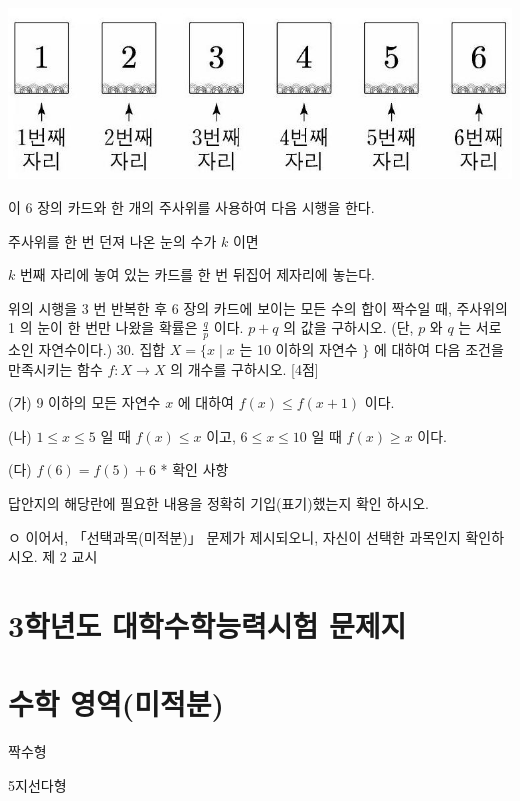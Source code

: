 \documentclass[10pt]{article}
\begin{document}
\begin{center}
\includegraphics[max width=\textwidth]{2023_05_19_a9cef858603f6abf5411g-32}
\end{center}

이 6 장의 카드와 한 개의 주사위를 사용하여 다음 시행을 한다.

주사위를 한 번 던져 나온 눈의 수가 $k$ 이면

$k$ 번째 자리에 놓여 있는 카드를 한 번 뒤집어 제자리에 놓는다.

위의 시행을 3 번 반복한 후 6 장의 카드에 보이는 모든 수의 합이 짝수일 때, 주사위의 1 의 눈이 한 번만 나왔을 확률은 $\frac{q}{p}$ 이다. $p+q$ 의 값을 구하시오. (단, $p$ 와 $q$ 는 서로소인 자연수이다.) 30. 집합 $X=\{x \mid x$ 는 10 이하의 자연수 $\}$ 에 대하여 다음 조건을 만족시키는 함수 $f: X \rightarrow X$ 의 개수를 구하시오. [4점]

(가) 9 이하의 모든 자연수 $x$ 에 대하여 $f(x) \leq f(x+1)$ 이다.

(나) $1 \leq x \leq 5$ 일 때 $f(x) \leq x$ 이고, $6 \leq x \leq 10$ 일 때 $f(x) \geq x$ 이다.

(다) $f(6)=f(5)+6$ * 확인 사항

답안지의 해당란에 필요한 내용을 정확히 기입(표기)했는지 확인 하시오.

ㅇ 이어서, 「선택과목(미적분)」 문제가 제시되오니, 자신이 선택한 과목인지 확인하시오. 제 2 교시

\section{3학년도 대학수학능력시험 문제지}
\section{수학 영역(미적분)}
짝수형

5지선다형
\end{document}
